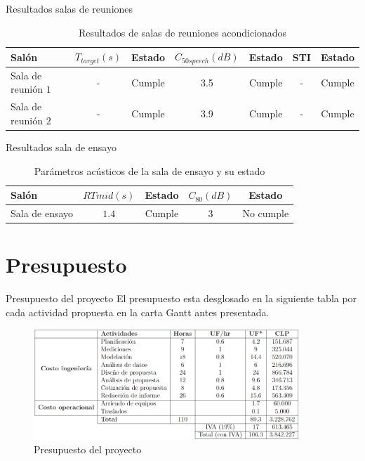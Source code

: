 \documentclass{sintefbeamer}
\begin{document}
\begin{frame}{Resultados salas de reuniones}
    \begin{table}[H]
        \centering
        \begin{tabular}{|l|c|c|c|c|c|c|}
        \hline
          \textbf{Salón}  & $T_{target} (s)$ & \textbf{Estado} & $C_{50speech}(dB)$ & \textbf{Estado} & STI & \textbf{Estado}\\ \hline
          Sala de reunión $1$   & - & Cumple & 3.5 & Cumple & - & Cumple \\ \hline
          Sala de reunión $2$   & - & Cumple & 3.9 & Cumple & - & Cumple \\ \hline
        \end{tabular}
        \caption{Resultados de salas de reuniones acondicionados}
        \label{tab: cumplimiento parametros RT}
    \end{table}
\end{frame}

\begin{frame}{Resultados sala de ensayo}
    \begin{table}[H]
        \centering
        \begin{tabular}{|l|c|c|c|c|}
        \hline
        \textbf{Salón} & $RT{mid} (s)$ & \textbf{Estado} & $C_{80}(dB)$ & \textbf{Estado} \\ \hline
        Sala de ensayo &  $1.4$ & Cumple & 3 & No cumple \\ \hline
        \end{tabular}
        \caption{Parámetros acústicos de la sala de ensayo y su estado}
        \label{tab:resultado sala ensayo acondicionado}
    \end{table}
\end{frame}


\section{Presupuesto}
\begin{frame}{Presupuesto del proyecto}
    El presupuesto esta desglosado en la siguiente tabla por cada actividad propuesta en la carta Gantt antes presentada.
\begin{figure}[H]
    \centering
    \includegraphics[width=10cm]{images/Presupuesto.png}
    \caption{Presupuesto del proyecto}
    \label{fig:presupuesto}
\end{figure}    
\end{frame}
\end{document}
